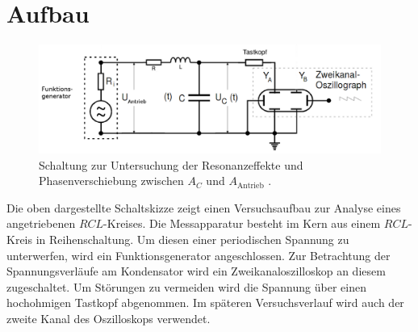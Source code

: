 \section{Aufbau}
\label{sec:Aufbau}

\begin{figure}[H]
         \centering
         \includegraphics[width=\linewidth-100pt,height=\textheight-100pt,keepaspectratio]{content/aufbau2.png}
         \caption{Schaltung zur Untersuchung der Resonanzeffekte und Phasenverschiebung zwischen $A_C$ und $A_{\text{Antrieb}}$ \cite{V354}.}
         \label{fig:Schalplanc}
       \end{figure}
 Die oben dargestellte Schaltskizze zeigt einen Versuchsaufbau zur Analyse eines
 angetriebenen $RCL$-Kreises. Die Messapparatur besteht im Kern aus einem
  $RCL$-Kreis in Reihenschaltung. Um diesen einer periodischen Spannung zu unterwerfen, wird ein
   Funktionsgenerator angeschlossen. Zur Betrachtung der Spannungsverläufe am
    Kondensator wird ein Zweikanaloszilloskop an diesem zugeschaltet. Um
     Störungen zu vermeiden wird die Spannung über einen hochohmigen Tastkopf abgenommen.
      Im späteren Versuchsverlauf wird auch der zweite Kanal des Oszilloskops verwendet.
